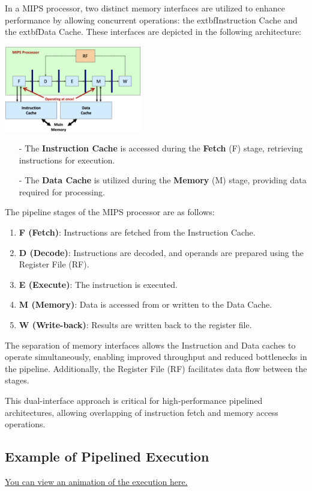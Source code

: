 In a MIPS processor, two distinct memory interfaces are utilized to enhance performance by allowing concurrent operations: the 	extbf{Instruction Cache} and the 	extbf{Data Cache}. These interfaces are depicted in the following architecture:
\begin{center}
    \includegraphics[width=0.45\textwidth]{chapters/chapter4c/images/mips.png}
\end{center}
\begin{itemize}
    \item[-] The \textbf{Instruction Cache} is accessed during the \textbf{Fetch} (F) stage, retrieving instructions for execution.
    \item[-] The \textbf{Data Cache} is utilized during the \textbf{Memory} (M) stage, providing data required for processing.
\end{itemize}

The pipeline stages of the MIPS processor are as follows:
\begin{enumerate}
    \item \textbf{F (Fetch)}: Instructions are fetched from the Instruction Cache.
    \item \textbf{D (Decode)}: Instructions are decoded, and operands are prepared using the Register File (RF).
    \item \textbf{E (Execute)}: The instruction is executed.
    \item \textbf{M (Memory)}: Data is accessed from or written to the Data Cache.
    \item \textbf{W (Write-back)}: Results are written back to the register file.
\end{enumerate}

The separation of memory interfaces allows the Instruction and Data caches to operate simultaneously, enabling improved throughput and reduced bottlenecks in the pipeline. Additionally, the Register File (RF) facilitates data flow between the stages.

This dual-interface approach is critical for high-performance pipelined architectures, allowing overlapping of instruction fetch and memory access operations.

\subsection{Example of Pipelined Execution }
\href{https://github.com/elazdi-al/comparch/raw/refs/heads/main/chapters/chapter4c/images/video.mp4}{You can view an animation of the execution here.}
